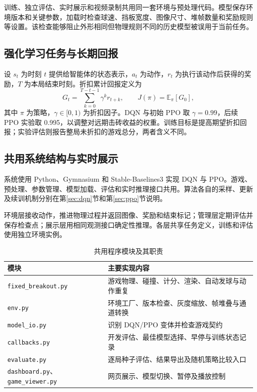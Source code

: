 训练、独立评估、实时展示和视频录制共用同一套环境与预处理代码。模型保存环境版本和关键参数，加载时检查球速、挡板宽度、图像尺寸、堆帧数量和奖励规则等设置。该检查能够阻止外形相同但物理规则不同的历史模型被误用于当前任务。

\subsection{强化学习任务与长期回报}
设 $s_t$ 为时刻 $t$ 提供给智能体的状态表示，$a_t$ 为动作，$r_t$ 为执行该动作后获得的奖励，$T$ 为本局结束时刻。折扣累计回报定义为
\begin{equation}
 G_t=\sum_{k=0}^{T-t-1}\gamma^k r_{t+k},\qquad
 J(\pi)=\mathbb{E}_{\pi}[G_0],
\end{equation}
其中 $\pi$ 为策略，$\gamma\in[0,1)$ 为折扣因子。DQN 与初始 PPO 取 $\gamma=0.99$，后续 PPO 实验取 0.995，以调整对远期击砖收益的权重。训练目标是提高期望折扣回报；实验评估则报告整局未折扣的游戏总分，两者含义不同。

\subsection{共用系统结构与实时展示}
系统使用 Python、Gymnasium 和 Stable-Baselines3 实现 DQN 与 PPO。游戏、预处理、参数管理、模型加载、评估和实时推理接口共用。算法各自的采样、更新及续训机制分别在第\ref{sec:dqn}节和第\ref{sec:ppo}节说明。

环境层接收动作，推进物理过程并返回图像、奖励和结束标记；管理层定期评估并保存检查点；展示层用相同观测接口确定性推理。各层共享任务定义，训练和评估使用独立环境实例。

\begin{table}[!htbp]
 \centering\small
 \caption{共用程序模块及其职责}\label{tab:modules}
 \begin{tabularx}{\linewidth}{P{4.5cm}Y}
 \toprule
 模块 & 主要实现内容\\
 \midrule
 \texttt{fixed\_breakout.py} & 游戏物理、碰撞、计分、渲染、自动发球与动作重复\\
 \texttt{env.py} & 环境工厂、版本检查、灰度缩放、帧堆叠与通道转换\\
 \texttt{model\_io.py} & 识别 DQN/PPO 变体并检查游戏契约\\
 \texttt{callbacks.py} & 开发评估、最佳模型选择、早停与训练状态记录\\
 \texttt{evaluate.py} & 逐局种子评估、结果导出及随机策略比较入口\\
 \texttt{dashboard.py}、\texttt{game\_viewer.py} & 网页展示、模型切换、暂停及播放控制\\
 \bottomrule
 \end{tabularx}
\end{table}

